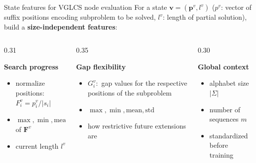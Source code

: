\documentclass{beamer}
\begin{document}
\begin{frame}{State features for VGLCS node evaluation}
\small
For a state $\textbf{v}=(\mathbf p^v,l^v)$ ($p^v$: vector of suffix positions encoding subproblem to be solved, $l^v$: length of partial solution), build a \textbf{size-independent features}:
\vspace{0.2cm}
\begin{columns}[T,totalwidth=\textwidth]
\begin{column}{0.31\textwidth}
\begin{block}{\textbf{Search progress}}
\begin{itemize}
\item normalize positions: $F_i^v=p_i^v/|s_i|$
\item $\max,\min,\mathrm{mean},\mathrm{std}$ of $\mathbf F^v$
\item current length $l^v$
\end{itemize}
\end{block}
\end{column}
\begin{column}{0.35\textwidth}
\begin{block}{\textbf{Gap flexibility}}
\begin{itemize}
\item $G^{v}_i:$ gap values for the respective positions of the subproblem %
\item $\max,\min,\mathrm{mean},\mathrm{std}$ %
\item how restrictive future extensions are
\end{itemize}
\end{block}
\end{column}
\begin{column}{0.30\textwidth}
\begin{block}{\textbf{Global context}}
\begin{itemize}
\item alphabet size $|\Sigma|$
\item number of sequences $m$
\item standardized before training
\end{itemize}
\end{block}
\end{column}
\end{columns}
\vspace{0.5cm}
\end{frame}
\end{document}
